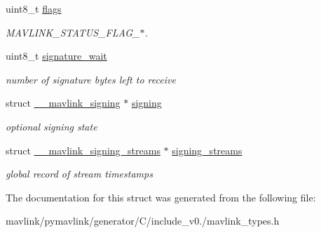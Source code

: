 \begin{DoxyCompactItemize}
uint8\+\_\+t \hyperlink{struct____mavlink__status_a2b67d268b29712b9607d1796228a77a2}{flags}
\begin{DoxyCompactList}\small\item\em M\+A\+V\+L\+I\+N\+K\+\_\+\+S\+T\+A\+T\+U\+S\+\_\+\+F\+L\+A\+G\+\_\+$\ast$. \end{DoxyCompactList}\item 
\mbox{\label{struct____mavlink__status_afbdd26652864ceeccf1155287752496c}} 
uint8\+\_\+t \hyperlink{struct____mavlink__status_afbdd26652864ceeccf1155287752496c}{signature\+\_\+wait}
\begin{DoxyCompactList}\small\item\em number of signature bytes left to receive \end{DoxyCompactList}\item 
\mbox{\label{struct____mavlink__status_a12ca1a2ade1b6b83d87a8cd7553884a9}} 
struct \hyperlink{struct____mavlink__signing}{\+\_\+\+\_\+mavlink\+\_\+signing} $\ast$ \hyperlink{struct____mavlink__status_a12ca1a2ade1b6b83d87a8cd7553884a9}{signing}
\begin{DoxyCompactList}\small\item\em optional signing state \end{DoxyCompactList}\item 
\mbox{\label{struct____mavlink__status_ab0e29fe56be92a4bbd722529ac76bd84}} 
struct \hyperlink{struct____mavlink__signing__streams}{\+\_\+\+\_\+mavlink\+\_\+signing\+\_\+streams} $\ast$ \hyperlink{struct____mavlink__status_ab0e29fe56be92a4bbd722529ac76bd84}{signing\+\_\+streams}
\begin{DoxyCompactList}\small\item\em global record of stream timestamps \end{DoxyCompactList}\end{DoxyCompactItemize}


The documentation for this struct was generated from the following file\+:\begin{DoxyCompactItemize}
\item 
mavlink/pymavlink/generator/\+C/include\+\_\+v0./mavlink\+\_\+types.\+h\end{DoxyCompactItemize}
